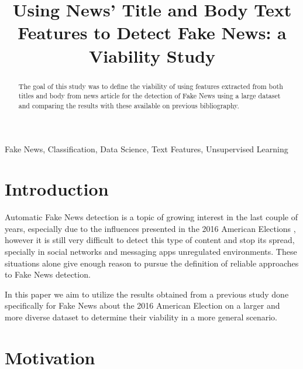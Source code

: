 \documentclass[conference]{IEEEtran}
\begin{document}
\title{ Using News' Title and Body Text Features to Detect Fake News: a Viability Study}


\author{
}

\maketitle

\begin{abstract}

The goal of this study was to define the viability of using features extracted from both titles
and body from news article for the detection of Fake News using a large dataset and comparing
the results with these available on previous bibliography.
\end{abstract}

\begin{IEEEkeywords}
Fake News, Classification, Data Science, Text Features, Unsupervised Learning
\end{IEEEkeywords}

\section{Introduction}

Automatic Fake News detection is a topic of growing interest in the last couple of years,
especially due to the influences presented in the 2016 American Elections \cite{allcott_gentzkow_2017},
however it is still very difficult to detect this type of content and stop its spread,
specially in social networks and messaging apps unregulated environments. These situations
alone give enough reason to pursue the definition of reliable approaches to Fake News detection.

In this paper we aim to utilize the results obtained from a previous study done specifically for Fake News
about the 2016 American Election \cite{horne_2017} on a larger and more diverse dataset to determine
their viability in a more general scenario.

\section{Motivation}
\end{document}
